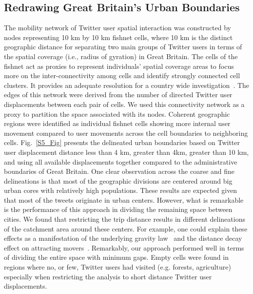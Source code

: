 \documentclass[]{tGIS2e}
\begin{document}
\subsection{Redrawing Great Britain's Urban Boundaries}
The mobility network of Twitter user spatial interaction was constructed by nodes representing 10 km by 10 km fishnet cells, where 10 km is the distinct geographic distance for separating two main groups of Twitter users in terms of the spatial coverage (i.e., radius of gyration) in Great Britain.
The cells of the fishnet act as proxies to represent individuals' spatial coverage areas to focus more on the inter-connectivity among cells and identify strongly connected cell clusters.
It provides an adequate resolution for a country wide investigation~\citep{ratti2010}.
The edges of this network were derived from the number of directed Twitter user displacements between each pair of cells.
We used this connectivity network as a proxy to partition the space associated with its nodes.
Coherent geographic regions were identified as individual fishnet cells showing more internal user movement compared to user movements across the cell boundaries to neighboring cells.
Fig.~\ref{S5_Fig}  presents the delineated urban boundaries based on Twitter user displacement distance less than 4 km, greater than 4km, greater than 10 km, and using all available displacements together compared to the administrative boundaries of Great Britain.
One clear observation across the coarse and fine delineations is that most of the geographic divisions are centered around big urban cores with relatively high populations.
These results are expected given that most of the tweets originate in urban centers.
However, what is remarkable is the performance of this approach in dividing the remaining space between cities.
We found that restricting the trip distance results in different delineations of the catchment area around these centers.
For example, one could explain these effects as a manifestation of the underlying gravity law~\citep{simini2012} and the distance decay effect on attracting movers~\citep{gonzalez2008}.
Remarkably, our approach performed well in terms of dividing the entire space with minimum gaps.
Empty cells were found in regions where no, or few, Twitter users had visited (e.g. forests, agriculture) especially when restricting the analysis to short distance Twitter user displacements.
\end{document}
